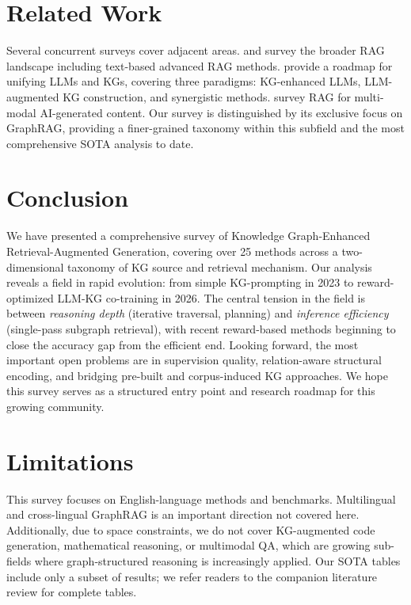 \documentclass[11pt]{article}
\begin{document}
\section{Related Work}
\label{sec:related}

Several concurrent surveys cover adjacent areas. \citet{gao2023ragsurvey} and \citet{gao2024modularrag} survey the broader RAG landscape including text-based advanced RAG methods. \citet{pan2024kgllmsurvey} provide a roadmap for unifying LLMs and KGs, covering three paradigms: KG-enhanced LLMs, LLM-augmented KG construction, and synergistic methods. \citet{zhao2024ragaigc} survey RAG for multi-modal AI-generated content. Our survey is distinguished by its exclusive focus on GraphRAG, providing a finer-grained taxonomy within this subfield and the most comprehensive SOTA analysis to date.

\section{Conclusion}
\label{sec:conclusion}

We have presented a comprehensive survey of Knowledge Graph-Enhanced Retrieval-Augmented Generation, covering over 25 methods across a two-dimensional taxonomy of KG source and retrieval mechanism. Our analysis reveals a field in rapid evolution: from simple KG-prompting in 2023 to reward-optimized LLM-KG co-training in 2026. The central tension in the field is between \emph{reasoning depth} (iterative traversal, planning) and \emph{inference efficiency} (single-pass subgraph retrieval), with recent reward-based methods beginning to close the accuracy gap from the efficient end. Looking forward, the most important open problems are in supervision quality, relation-aware structural encoding, and bridging pre-built and corpus-induced KG approaches. We hope this survey serves as a structured entry point and research roadmap for this growing community.

\section*{Limitations}

This survey focuses on English-language methods and benchmarks. Multilingual and cross-lingual GraphRAG is an important direction not covered here. Additionally, due to space constraints, we do not cover KG-augmented code generation, mathematical reasoning, or multimodal QA, which are growing sub-fields where graph-structured reasoning is increasingly applied. Our SOTA tables include only a subset of results; we refer readers to the companion literature review for complete tables.
\end{document}
